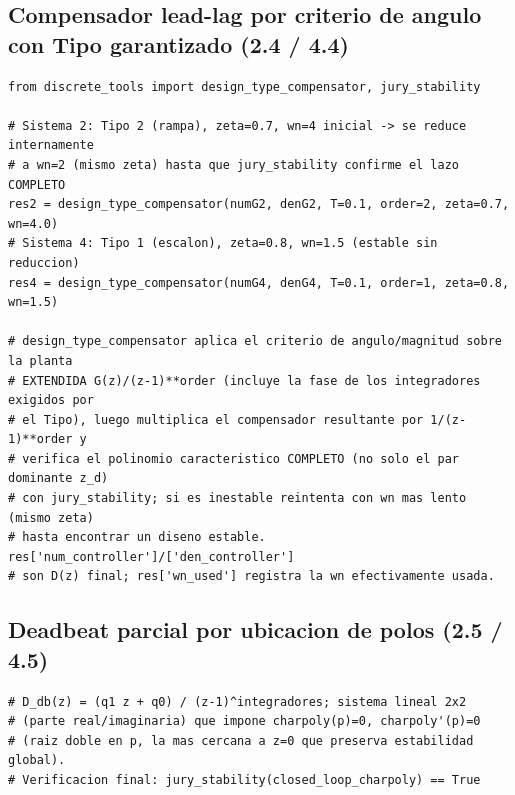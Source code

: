 \documentclass[11pt]{article}
\begin{document}
\subsection*{Compensador lead-lag por criterio de angulo con Tipo garantizado (2.4 / 4.4)}
\begin{lstlisting}
from discrete_tools import design_type_compensator, jury_stability

# Sistema 2: Tipo 2 (rampa), zeta=0.7, wn=4 inicial -> se reduce internamente
# a wn=2 (mismo zeta) hasta que jury_stability confirme el lazo COMPLETO
res2 = design_type_compensator(numG2, denG2, T=0.1, order=2, zeta=0.7, wn=4.0)
# Sistema 4: Tipo 1 (escalon), zeta=0.8, wn=1.5 (estable sin reduccion)
res4 = design_type_compensator(numG4, denG4, T=0.1, order=1, zeta=0.8, wn=1.5)

# design_type_compensator aplica el criterio de angulo/magnitud sobre la planta
# EXTENDIDA G(z)/(z-1)**order (incluye la fase de los integradores exigidos por
# el Tipo), luego multiplica el compensador resultante por 1/(z-1)**order y
# verifica el polinomio caracteristico COMPLETO (no solo el par dominante z_d)
# con jury_stability; si es inestable reintenta con wn mas lento (mismo zeta)
# hasta encontrar un diseno estable. res['num_controller']/['den_controller']
# son D(z) final; res['wn_used'] registra la wn efectivamente usada.
\end{lstlisting}

\subsection*{Deadbeat parcial por ubicacion de polos (2.5 / 4.5)}
\begin{lstlisting}
# D_db(z) = (q1 z + q0) / (z-1)^integradores; sistema lineal 2x2
# (parte real/imaginaria) que impone charpoly(p)=0, charpoly'(p)=0
# (raiz doble en p, la mas cercana a z=0 que preserva estabilidad global).
# Verificacion final: jury_stability(closed_loop_charpoly) == True
\end{lstlisting}
\end{document}
